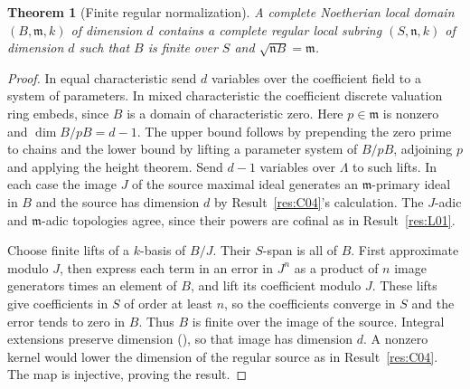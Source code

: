 \documentclass[11pt,oneside,openany]{book}
\newtheorem{theorem}{Theorem}[chapter]
\theoremstyle{definition}
\theoremstyle{remark}
\begin{document}
\begin{theorem}[Finite regular normalization]\label{res:C05}
A complete Noetherian local domain \((B,\mathfrak m,k)\) of
dimension \(d\) contains a complete regular local subring
\((S,\mathfrak n,k)\) of dimension \(d\) such that \(B\) is finite
over \(S\) and \(\sqrt{\mathfrak n B}=\mathfrak m\).
\end{theorem}
\begin{proof}
In equal characteristic send \(d\) variables over the coefficient
field to a system of parameters. In mixed characteristic the
coefficient discrete valuation ring embeds, since \(B\) is a
domain of characteristic zero. Here \(p\in\mathfrak m\) is
nonzero and \(\dim B/pB=d-1\). The upper bound follows by
prepending the zero prime to chains and the lower bound by
lifting a parameter system of \(B/pB\), adjoining \(p\) and applying
the height theorem. Send \(d-1\) variables over \(\Lambda\) to such
lifts. In each case the image \(J\) of the source maximal ideal
generates an \(\mathfrak m\)-primary ideal in \(B\) and the source
has dimension \(d\) by Result~\ref{res:C04}'s calculation.
The \(J\)-adic and \(\mathfrak m\)-adic topologies agree, since their
powers are cofinal as in Result~\ref{res:L01}.

Choose finite lifts of a \(k\)-basis of \(B/J\).
Their \(S\)-span is all of \(B\). First approximate modulo \(J\),
then express each term in an error in \(J^n\) as a product of
\(n\) image generators times an element of \(B\), and lift its
coefficient modulo \(J\). These lifts give coefficients in \(S\)
of order at least \(n\), so the coefficients converge in \(S\) and
the error tends to zero in \(B\). Thus \(B\) is finite over the
image of the source. Integral extensions preserve dimension
(\cite[ALG-05-C01-S04]{p103}), so that image has dimension \(d\).
A nonzero kernel would lower the dimension of the regular source
as in Result~\ref{res:C04}. The map is injective, proving the result.
\end{proof}
\backmatter
\begingroup
\small
\end{document}
